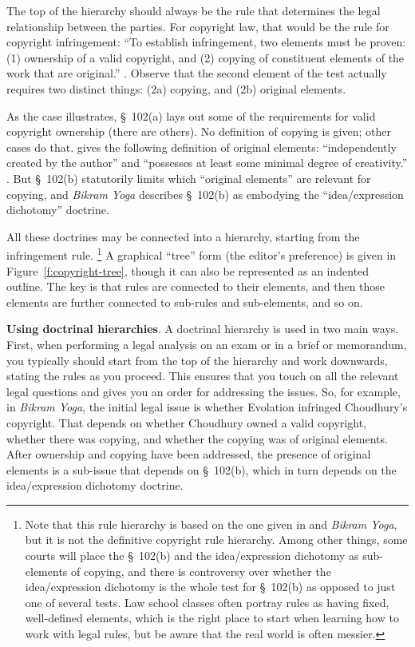 The top of the hierarchy should always be the rule that determines the legal
relationship between the parties. For copyright law, that would be the rule for
copyright infringement: ``To establish infringement, two elements must be
proven: (1) ownership of a valid copyright, and (2) copying of constituent
elements of the work that are original.'' .
Observe that the second element of the test actually requires two distinct
things: (2a) copying, and (2b) original elements.

As the case illustrates, \S~102(a) lays out some of the requirements for valid
copyright ownership (there are others). No definition of copying is given; other
cases do that.  gives the following definition of original
elements: ``independently created by the author'' and ``possesses at least some
minimal degree of creativity.'' . But \S~102(b)
statutorily limits which ``original elements'' are relevant for copying, and
\emph{Bikram Yoga} describes \S~102(b) as embodying the ``idea/expression
dichotomy'' doctrine.

All these doctrines may be connected into a hierarchy, starting from the
infringement rule. \unskip\footnote{Note that this rule hierarchy is based on
the one given in  and \emph{Bikram Yoga}, but it is not
the definitive copyright rule hierarchy. Among other things, some courts will
place the \S~102(b) and the idea/expression dichotomy as sub-elements of
copying, and there is controversy over whether the idea/expression dichotomy is
the whole test for \S~102(b) as opposed to just one of several tests. Law school
classes often portray rules as having fixed, well-defined elements, which is the
right place to start when learning how to work with legal rules, but be aware
that the real world is often messier.} A graphical ``tree'' form (the editor's
preference) is given in Figure~\ref{f:copyright-tree}, though it can also be
represented as an indented outline. The key is that rules are connected to their
elements, and then those elements are further connected to sub-rules and
sub-elements, and so on.

\item \textbf{Using doctrinal hierarchies}. A doctrinal hierarchy is used in two
main ways. First, when performing a legal analysis on an exam or in a brief or
memorandum, you typically should start from the top of the hierarchy and work
downwards, stating the rules as you proceed. This ensures that you touch on all
the relevant legal questions and gives you an order for addressing the issues.
So, for example, in \emph{Bikram Yoga}, the initial legal issue is whether
Evolation infringed Choudhury's copyright. That depends on whether Choudhury
owned a valid copyright, whether there was copying, and whether the copying was
of original elements. After ownership and copying have been addressed, the
presence of original elements is a sub-issue that depends on \S~102(b), which in
turn depends on the idea/expression dichotomy doctrine.

